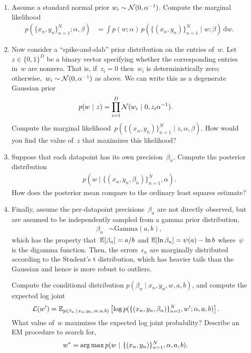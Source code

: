 \documentclass[11pt]{article}
\begin{document}
\begin{enumerate}[label=(\alph*)]

\item Assume a standard normal prior $w_i \sim \mathcal{N}(0, \alpha^{-1})$.  Compute the marginal likelihood
\begin{align*}
    p(\{x_n, y_n\}_{n=1}^N; \alpha, \beta) &= \int p(w; \alpha) \, p(\{(x_n, y_n)\}_{n=1}^N \mid w; \beta) \, \mathrm{d}w.
\end{align*}

\item Now consider a ``spike-and-slab'' prior distribution on the entries of~$w$.  Let~$z \in \{0, 1\}^{D}$ be a binary vector specifying whether the corresponding entries in~$w$ are nonzero.  That is, if~$z_{i}=0$ then~$w_{i}$ is deterministically zero; otherwise,~$w_{i} \sim \mathcal{N}(0, \alpha^{-1})$ as above.  We can write this as a degenerate Gaussian prior
\begin{align*}
    p(w ~\vert~ z) &= \prod_{i=1}^{D} \mathcal{N}(w_{i} ~\vert~ 0, z_{i} \alpha^{-1}).
\end{align*}
Compute the marginal likelihood~$p(\{(x_n, y_n)\}_{n=1}^N \mid z, \alpha, \beta)$.  How would you find the value of~$z$ that maximizes this likelihood?

\item Suppose that each datapoint has its own precision~$\beta_n$.  Compute the posterior distribution
\begin{align*}
    p(w \mid \{(x_n, y_n, \beta_n)\}_{n=1}^N, \alpha).
\end{align*}
How does the posterior mean compare to the ordinary least squares estimate?

\item Finally, assume the per-datapoint precisions~$\beta_n$ are not directly observed, but are assumed to be independently sampled from a gamma prior distribution,
\begin{align*}
    \beta_n &\sim \mathrm{Gamma}(a, b),
\end{align*}
which has the property that~$\mathbb{E}[\beta_n] = a/b $ and $\mathbb{E}[\ln \beta_n] = \psi(a) - \ln b$ where~$\psi$ is the digamma function.  Then, the errors~$\epsilon_n$ are marginally distributed according to the Student's t distribution, which has heavier tails than the Gaussian and hence is more robust to outliers. 

Compute the conditional distribution $p(\beta_n \mid x_n, y_n, w, a, b)$, and compute the expected log joint 
\begin{align*}
    \mathcal{L}(w') &= \mathbb{E}_{p(\beta_n \,|\, x_n, y_n, w, a, b)} \left[ \log p(\{(x_n, y_n, \beta_n)\}_{n=1}^N, w'; \alpha, a, b) \right].
\end{align*}
What value of~$w$ maximizes the expected log joint probability?  Describe an EM procedure to search for,
\begin{align*}
    w^* &= \operatorname*{arg\,max} p(w ~\vert~ \{(x_n, y_n)\}_{n=1}^N, \alpha, a, b).
\end{align*}

\end{enumerate}
\end{document}
